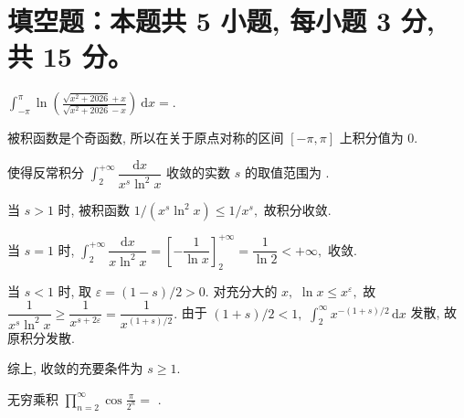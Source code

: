 \section{填空题：本题共 5 小题, 每小题 3 分, 共 15 分。}



\begin{question}
$\int_{-\pi}^{\pi} \ln \left( \frac{\sqrt{x^2 + 2026} + x}{\sqrt{x^2 + 2026} - x} \right) ~ \mathrm{d}x =$\fillin [$0$].
\end{question}

\begin{solution}
被积函数是个奇函数, 所以在关于原点对称的区间 $[-\pi, \pi]$ 上积分值为 $0.$
\end{solution}


\begin{question}
使得反常积分 $\displaystyle \int_2^{+\infty} \dfrac{\mathrm{d}x}{x^s \ln^2 x}$ 收敛的实数 $s$ 的取值范围为 \fillin[$s \geqslant 1$].
\end{question}

\begin{solution}
当 $s > 1$ 时, 被积函数 $1/(x^s \ln^2 x) \leqslant 1/x^s,$ 故积分收敛.

当 $s = 1$ 时, $\displaystyle\int_2^{+\infty} \dfrac{\mathrm{d}x}{x \ln^2 x} = \left[ -\dfrac{1}{\ln x} \right]_2^{+\infty} = \dfrac{1}{\ln 2} < +\infty,$ 收敛.

当 $s < 1$ 时, 取 $\varepsilon = (1-s)/2 > 0.$ 对充分大的 $x,$ $\ln x \leqslant x^\varepsilon,$ 故 $\dfrac{1}{x^s \ln^2 x} \geqslant \dfrac{1}{x^{s+2\varepsilon}} = \dfrac{1}{x^{(1+s)/2}}.$ 由于 $(1+s)/2 < 1,$ $\int_2^\infty x^{-(1+s)/2}\,\mathrm{d}x$ 发散, 故原积分发散.

综上, 收敛的充要条件为 $s \geqslant 1.$
\end{solution}


\begin{question}
无穷乘积 $\prod_{n=2}^{\infty} \cos \frac{\pi}{2^n} =$ \fillin[$\frac{2}{\pi}$].
\end{question}

